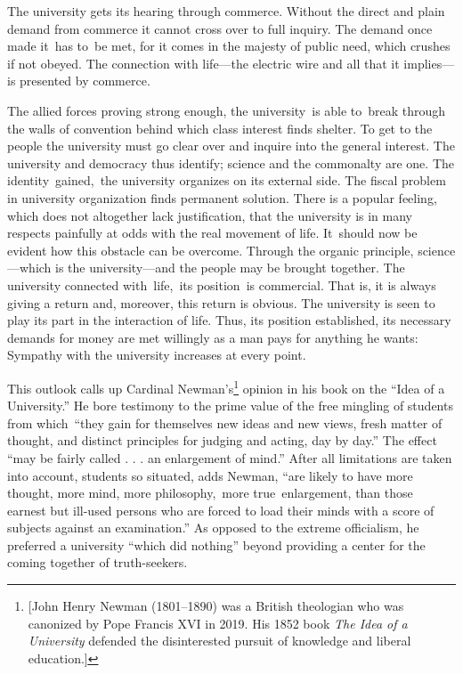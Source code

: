 \documentclass[openany,nobib]{tufte-book}
\begin{document}
The university gets its hearing through commerce. Without the direct and
plain demand from commerce it cannot cross over to full inquiry. The
demand once made it~has to~be met, for it comes in the majesty of public
need, which crushes if not obeyed. The connection with life---the
electric wire and all that it implies---is presented by commerce.~

The allied forces proving strong enough, the university~is able to~break
through the walls of convention behind which class interest finds
shelter. To get to the people the university must go clear over and
inquire into the general interest. The university and democracy thus
identify; science and the commonalty are one. The identity~gained,~the
university organizes on its external side. The fiscal problem in
university organization finds permanent solution. There is a popular
feeling, which does not altogether lack justification, that the
university is in many respects painfully at odds with the real movement
of life. It~should now be evident how this obstacle can be overcome.
Through the organic principle, science---which is the university---and
the people may be brought together. The university connected
with~life,~its position~is commercial. That is, it is always giving a
return and, moreover, this return is obvious. The university is seen to
play its part in the interaction of life. Thus, its position
established, its necessary demands for money are met willingly as a man
pays for anything he wants: Sympathy with the university increases at
every point.~

This outlook calls up Cardinal Newman's\footnote{{[}John Henry Newman
  (1801--1890) was a British theologian who was canonized by Pope
  Francis XVI in 2019. His 1852 book \emph{The Idea of a University}
  defended the disinterested pursuit of knowledge and liberal
  education.\href{applewebdata://D02306DF-3E46-4684-BD1A-1A323FFB2CB2\#_msocom_1}{{]}}}
opinion in his book on the ``Idea of a University.'' He bore testimony
to the prime value of the free mingling of students from which~``they
gain for themselves new ideas and new views, fresh matter of thought,
and distinct principles for judging and acting, day by day.'' The effect
``may be fairly called . . . an enlargement of mind.'' After all
limitations are taken into account, students so situated, adds Newman,
``are likely to have more thought, more mind, more philosophy,~more
true~enlargement, than those earnest but ill-used persons who are forced
to load their minds with a score of subjects against an examination.''
As opposed to the extreme officialism, he preferred a university ``which
did nothing'' beyond providing a center for the coming together of
truth-seekers.~
\end{document}
